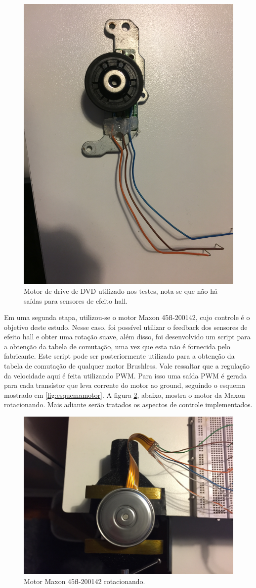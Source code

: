 \documentclass[a4paper,11pt]{article}
\begin{document}
		\begin{figure}[ht]
			\centering
			\includegraphics[width=0.5\linewidth]{images/motorantigo}
			\caption{Motor de drive de DVD utilizado nos testes, nota-se que não há saídas para sensores de efeito hall.}
			\label{fig:motorantigo}
		\end{figure}
	
		\newpage
		
		Em uma segunda etapa, utilizou-se o motor Maxon 45fl-200142, cujo controle é o objetivo deste estudo. Nesse caso, foi possível utilizar o feedback dos sensores de efeito hall e obter uma rotação suave, além disso, foi desenvolvido um script para a obtenção da tabela de comutação, uma vez que esta não é fornecida pelo fabricante. Este script pode ser posteriormente utilizado para a obtenção da tabela de comutação de qualquer motor Brushless. Vale ressaltar que a regulação da velocidade aqui é feita utilizando PWM. Para isso uma saída PWM é gerada para cada transístor que leva corrente do motor ao ground, seguindo o esquema mostrado em \ref{fig:esquemamotor}.
		A figura \ref{fig:motornovo}, abaixo, mostra o motor da Maxon rotacionando. Mais adiante serão tratados os aspectos de controle implementados.
		
		\begin{figure}[ht]
			\centering
			\includegraphics[width=0.5\linewidth]{images/motornovo}
			\caption{Motor Maxon 45fl-200142 rotacionando.}
			\label{fig:motornovo}
		\end{figure}
	
\end{document}
